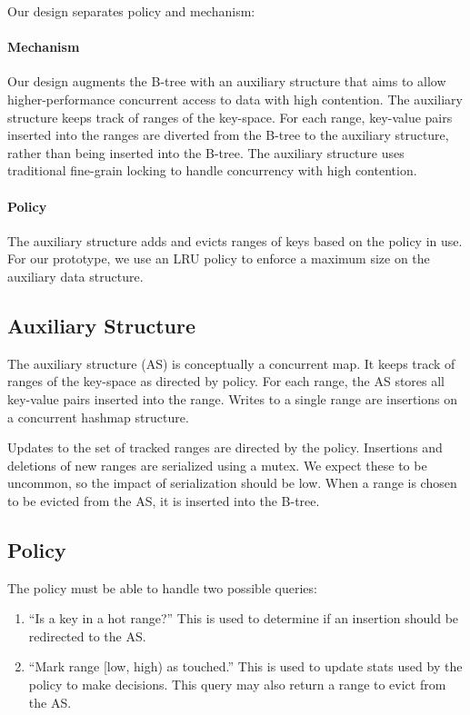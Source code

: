 \documentclass[twocolumn]{article}
\begin{document}
Our design separates policy and mechanism:

\paragraph{Mechanism} Our design augments the B-tree with an auxiliary
structure that aims to allow higher-performance concurrent access to data with
high contention. The auxiliary structure keeps track of ranges of the
key-space. For each range, key-value pairs inserted into the ranges are
diverted from the B-tree to the auxiliary structure, rather than being inserted
into the B-tree. The auxiliary structure uses traditional fine-grain locking to
handle concurrency with high contention.

\paragraph{Policy} The auxiliary structure adds and evicts ranges of keys based
on the policy in use. For our prototype, we use an LRU policy to enforce a
maximum size on the auxiliary data structure.

\subsection{Auxiliary Structure}

The auxiliary structure (AS) is conceptually a concurrent map. It keeps track
of ranges of the key-space as directed by policy. For each range, the AS stores
all key-value pairs inserted into the range. Writes to a single range are
insertions on a concurrent hashmap structure.

Updates to the set of tracked ranges are directed by the policy. Insertions and
deletions of new ranges are serialized using a mutex. We expect these to be
uncommon, so the impact of serialization should be low. When a range is chosen
to be evicted from the AS, it is inserted into the B-tree.

\subsection{Policy}

The policy must be able to handle two possible queries:

\begin{enumerate}
\item ``Is a key in a hot range?'' This is used to determine if an insertion
should be redirected to the AS.
\item ``Mark range [low, high) as touched.'' This is used to update stats used
by the policy to make decisions. This query may also return a range to evict
from the AS.
\end{enumerate}
\end{document}
